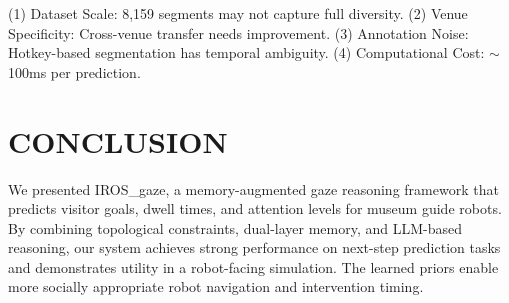 \documentclass{article}
\begin{document}
(1) Dataset Scale: 8,159 segments may not capture full diversity. (2) Venue Specificity: Cross-venue transfer needs improvement. (3) Annotation Noise: Hotkey-based segmentation has temporal ambiguity. (4) Computational Cost: $\sim$100ms per prediction.

\section{CONCLUSION}

We presented IROS\_gaze, a memory-augmented gaze reasoning framework that predicts visitor goals, dwell times, and attention levels for museum guide robots. By combining topological constraints, dual-layer memory, and LLM-based reasoning, our system achieves strong performance on next-step prediction tasks and demonstrates utility in a robot-facing simulation. The learned priors enable more socially appropriate robot navigation and intervention timing.
\end{document}
